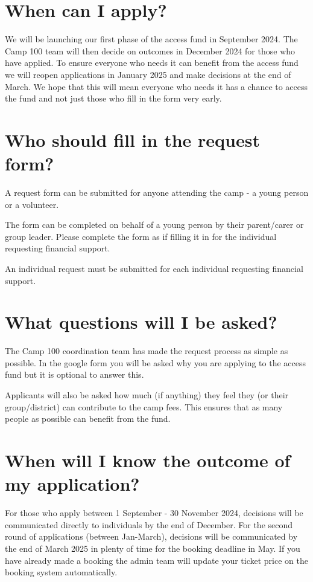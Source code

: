 \documentclass[a4paper, 11pt]{article}
\begin{document}
\section{When can I apply?}
We will be launching our first phase of the access fund in September 2024. The Camp 100 team will then decide on outcomes in December 2024 for those who have applied. To ensure everyone who needs it can benefit from the access fund we will reopen applications in January 2025 and make decisions at the end of March. We hope that this will mean everyone who needs it has a chance to access the fund and not just those who fill in the form very early. 

\section{Who should fill in the request form?}
A request form can be submitted for anyone attending the camp - a young person or a volunteer.

The form can be completed on behalf of a young person by their parent/carer or group leader. Please complete the form as if filling it in for the individual requesting financial support.

An individual request must be submitted for each individual requesting financial support.

\section{What questions will I be asked?}
The Camp 100 coordination team has made the request process as simple as possible. In the google form you will be asked why you are applying to the access fund but it is optional to answer this. 

Applicants will also be asked how much (if anything) they feel they (or their group/district) can contribute to the camp fees. This ensures that as many people as possible can benefit from the fund. 

\section{When will I know the outcome of my application?}
For those who apply between 1 September - 30 November 2024, decisions will be communicated directly to individuals by the end of December. For the second round of applications (between Jan-March), decisions will be communicated by the end of March 2025 in plenty of time for the booking deadline in May. 
If you have already made a booking the admin team will update your ticket price on the booking system automatically. 
\end{document}
